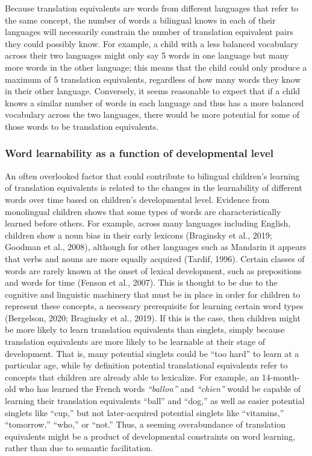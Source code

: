 \documentclass[
  english,
  ,man,floatsintext]{apa6}
\begin{document}
Because translation equivalents are words from different languages that refer to the same concept, the number of words a bilingual knows in each of their languages will necessarily constrain the number of translation equivalent pairs they could possibly know. For example, a child with a less balanced vocabulary across their two languages might only say 5 words in one language but many more words in the other language; this means that the child could only produce a maximum of 5 translation equivalents, regardless of how many words they know in their other language. Conversely, it seems reasonable to expect that if a child knows a similar number of words in each language and thus has a more balanced vocabulary across the two languages, there would be more potential for some of those words to be translation equivalents.

\hypertarget{word-learnability-as-a-function-of-developmental-level}{%
\subsubsection{Word learnability as a function of developmental level}\label{word-learnability-as-a-function-of-developmental-level}}

An often overlooked factor that could contribute to bilingual children's learning of translation equivalents is related to the changes in the learnability of different words over time based on children's developmental level. Evidence from monolingual children shows that some types of words are characteristically learned before others. For example, across many languages including English, children show a noun bias in their early lexicons (Braginsky et al., 2019; Goodman et al., 2008), although for other languages such as Mandarin it appears that verbs and nouns are more equally acquired (Tardif, 1996). Certain classes of words are rarely known at the onset of lexical development, such as prepositions and words for time (Fenson et al., 2007). This is thought to be due to the cognitive and linguistic machinery that must be in place in order for children to represent these concepts, a necessary prerequisite for learning certain word types (Bergelson, 2020; Braginsky et al., 2019). If this is the case, then children might be more likely to learn translation equivalents than singlets, simply because translation equivalents are more likely to be learnable at their stage of development. That is, many potential singlets could be ``too hard'' to learn at a particular age, while by definition potential translational equivalents refer to concepts that children are already able to lexicalize. For example, an 14-month-old who has learned the French words \emph{``ballon''} and \emph{``chien''} would be capable of learning their translation equivalents ``ball'' and ``dog,'' as well as easier potential singlets like ``cup,'' but not later-acquired potential singlets like ``vitamins,'' ``tomorrow,'' ``who,'' or ``not.'' Thus, a seeming overabundance of translation equivalents might be a product of developmental constraints on word learning, rather than due to semantic facilitation.
\end{document}
